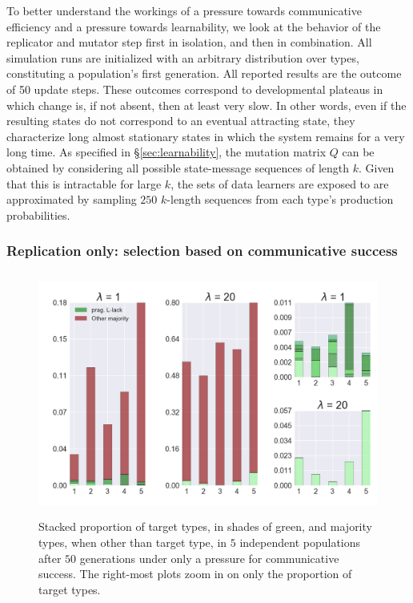 \documentclass[a4paper, 11pt]{article}
\theoremstyle{Satz}
\begin{document}
To better understand the workings of a pressure towards communicative efficiency and a pressure
towards learnability, we look at the behavior of the replicator and mutator step first in
isolation, and then in combination. All simulation runs are initialized with an arbitrary
distribution over types, constituting a population's first generation. All reported results are
the outcome of 50 update steps. These outcomes correspond to developmental plateaus in which
change is, if not absent, then at least very slow. In other words, even if the resulting states
do not correspond to an eventual attracting state, they characterize long almost stationary
states in which the system remains for a very long time. As specified in
\S\ref{sec:learnability}, the mutation matrix $Q$ can be obtained by considering all possible
state-message sequences of length $k$. Given that this is intractable for large $k$, the sets
of data learners are exposed to are approximated by sampling $250$ $k$-length sequences from
each type's production probabilities.


\subsubsection{Replication only: selection based on communicative success} 


\begin{figure}[t]
\centering
\includegraphics[width=\textwidth,height=8cm, keepaspectratio]{./plots/fig1-onlyr}
\caption{Stacked proportion of target types, in shades of green, and majority types, when other
  than target type, in $5$ independent populations after $50$ generations under only a
  pressure for communicative success. The right-most plots zoom in on only the proportion of target types.}
\label{fig:only-R}
\end{figure}
\end{document}
